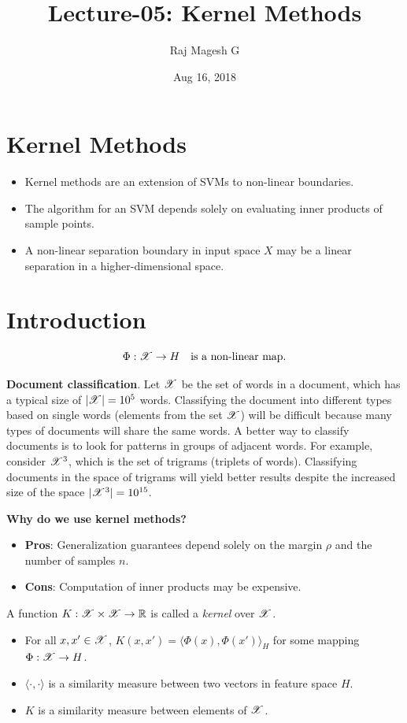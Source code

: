 \documentclass[a4paper,english,12pt]{article}
\title{Lecture-05: Kernel Methods}
\date{Aug 16, 2018}
\author{Raj Magesh G}
\begin{document}
\maketitle
\section{Kernel Methods}

\begin{itemize}
	\item Kernel methods are an extension of SVMs to non-linear boundaries.
	\item The algorithm for an SVM depends solely on evaluating inner products of sample points.
	\item A non-linear separation boundary in input space $X$ may be a linear separation in a higher-dimensional space.
\end{itemize}

\section{Introduction}

\[\Phi : \mathscr{X} \rightarrow H ~~~ \text{is a non-linear map.}\]


\begin{exmp}
\textbf{Document classification}. Let $\mathscr{X}$ be the set of words in a document, which has a typical size of $|\mathscr{X}| = 10^5$ words. Classifying the document into different types based on single words (elements from the set $\mathscr{X}$) will be difficult because many types of documents will share the same words. A better way to classify documents is to look for patterns in groups of adjacent words. For example, consider $\mathscr{X}^3$, which is the set of trigrams (triplets of words). Classifying documents in the space of trigrams will yield better results despite the increased size of the space $|\mathscr{X}^3| = 10^{15}$.
\end{exmp}

\begin{rem}
	\textbf{Why do we use kernel methods?}
\begin{itemize}
	\item \textbf{Pros}: Generalization guarantees depend solely on the margin $\rho$ and the number of samples $n$.
	\item \textbf{Cons}: Computation of inner products may be expensive.
\end{itemize}
\end{rem}

\begin{defn}
	A function $K : \mathscr{X} \times \mathscr{X} \rightarrow \mathbb{R}$ is called a \textit{kernel} over $\mathscr{X}$.
\begin{itemize}
	\item For all $x, x' \in \mathscr{X}$, $K(x, x') = \langle \Phi(x), \Phi(x') \rangle_{H}$ for some mapping $\Phi : \mathscr{X} \rightarrow H$.
	\item $\langle \cdot, \cdot \rangle$ is a similarity measure between two vectors in feature space $H$.
	\item $K$ is a similarity measure between elements of $\mathscr{X}$.	
\end{itemize}
\end{defn}
\end{document}
